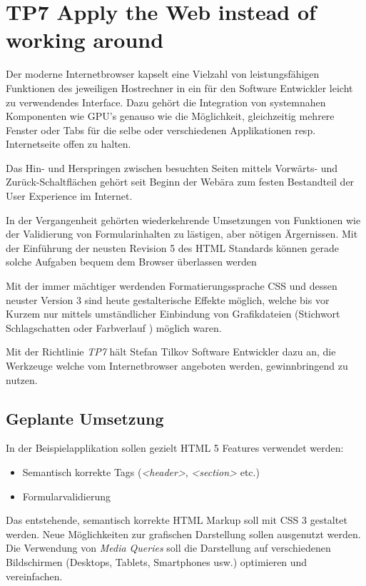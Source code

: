\section{TP7 Apply the Web instead of working around}
\label{sec:principle-tp7-apply-the-web}

Der moderne Internetbrowser kapselt eine Vielzahl von leistungsfähigen Funktionen des jeweiligen Hostrechner in ein für den Software Entwickler leicht zu verwendendes Interface. Dazu gehört die Integration von systemnahen Komponenten wie \gls{GPU}'s \cite{webgl} genauso wie die Möglichkeit, gleichzeitig mehrere Fenster oder Tabs für die selbe oder verschiedenen Applikationen resp. Internetseite offen zu halten.

Das Hin- und Herspringen zwischen besuchten Seiten mittels Vorwärts- und Zurück-Schaltflächen gehört seit Beginn der Webära zum festen Bestandteil der User Experience im Internet.

In der Vergangenheit gehörten wiederkehrende Umsetzungen von Funktionen wie der Validierung von Formularinhalten zu lästigen, aber nötigen Ärgernissen. Mit der Einführung der neusten Revision 5 des HTML Standards können gerade solche Aufgaben bequem dem Browser \cite{HTML5Forms} überlassen werden

Mit der immer mächtiger werdenden Formatierungssprache CSS und dessen neuster Version 3 sind heute gestalterische Effekte möglich, welche bis vor Kurzem nur mittels umständlicher Einbindung von Grafikdateien (Stichwort Schlagschatten \cite{css-box-shadow} oder Farbverlauf \cite{css-gradient}) möglich waren.

Mit der Richtlinie \emph{TP7} hält Stefan Tilkov Software Entwickler dazu an, die Werkzeuge welche vom Internetbrowser angeboten werden, gewinnbringend zu nutzen.


\subsection*{Geplante Umsetzung}

In der Beispielapplikation sollen gezielt HTML 5 Features verwendet werden:

\begin{itemize}
	\item Semantisch korrekte Tags (\emph{<header>}, \emph{<section>} etc.) \cite{SemanticHTML}
	\item Formularvalidierung \cite{HTML5Forms}
\end{itemize}

Das entstehende, semantisch korrekte HTML Markup soll mit CSS 3 gestaltet werden. Neue Möglichkeiten zur grafischen Darstellung sollen ausgenutzt werden. Die Verwendung von \emph{Media Queries} \cite{css-mediaquery} soll die  Darstellung auf verschiedenen Bildschirmen (Desktops, Tablets, Smartphones usw.) optimieren und vereinfachen.

